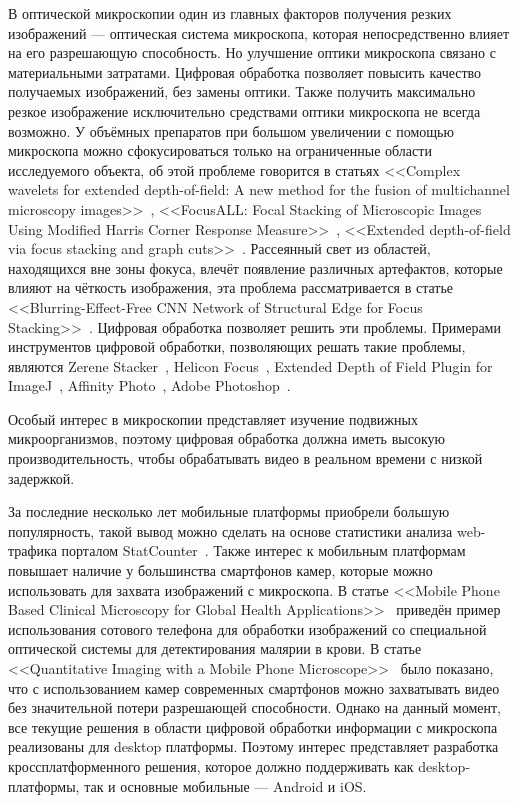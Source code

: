 \documentclass[14pt]{matmex-diploma-custom}
\begin{document}
В оптической микроскопии один из главных факторов получения резких изображений --- оптическая система микроскопа, которая непосредственно влияет на его разрешающую способность. Но улучшение оптики микроскопа связано с материальными затратами. Цифровая обработка позволяет повысить качество получаемых изображений, без замены оптики. Также получить максимально резкое изображение исключительно средствами оптики микроскопа не всегда возможно. У объёмных препаратов при большом увеличении с помощью микроскопа можно сфокусироваться только на ограниченные области исследуемого объекта, об этой проблеме говорится в статьях <<Complex wavelets for extended depth-of-field: A new method for the fusion of multichannel microscopy images>>~\cite{MethodForTheFusion}, <<FocusALL: Focal Stacking of Microscopic Images Using Modified Harris Corner Response Measure>>~\cite{ModifiedHarrisCorner}, <<Extended depth-of-field via focus stacking and graph cuts>>~\cite{ExtendedDepthOfField}. Рассеянный свет из областей, находящихся вне зоны фокуса, влечёт появление различных артефактов, которые влияют на чёткость изображения, эта проблема рассматривается в статье <<Blurring-Effect-Free CNN Network of Structural Edge for Focus Stacking>>~\cite{BlurringEffectFree}. Цифровая обработка позволяет решить эти проблемы. Примерами инструментов цифровой обработки, позволяющих решать такие проблемы, являются Zerene Stacker~\cite{ZereneStacker}, Helicon Focus~\cite{HeliconFocus}, Extended Depth of Field Plugin for ImageJ~\cite{ExtendedDepthOfField}, Affinity Photo~\cite{Affinity}, Adobe Photoshop~\cite{Photoshop}.
\par
Особый интерес в микроскопии представляет изучение подвижных микроорганизмов, поэтому цифровая обработка должна иметь высокую производительность, чтобы обрабатывать видео в реальном времени с низкой задержкой.
\par
За последние несколько лет мобильные платформы приобрели большую популярность, такой вывод можно сделать на основе статистики анализа web-трафика порталом StatCounter~\cite{StatCounter}. Также интерес к мобильным платформам повышает наличие у большинства смартфонов камер, которые можно использовать для захвата изображений с микроскопа. В статье <<Mobile Phone Based Clinical Microscopy for Global Health Applications>>~\cite{GlobalHealthApplications} приведён пример использования сотового телефона для обработки изображений со специальной оптической системы для детектирования малярии в крови. В статье <<Quantitative Imaging with a Mobile Phone Microscope>>~\cite{QuantImage} было показано, что с использованием камер современных смартфонов можно захватывать видео без значительной потери разрешающей способности. Однако на данный момент, все текущие решения в области цифровой обработки информации с микроскопа реализованы для desktop платформы. Поэтому интерес представляет разработка кроссплатформенного решения, которое должно поддерживать как desktop-платформы, так и основные мобильные --- Android и iOS.
\end{document}
